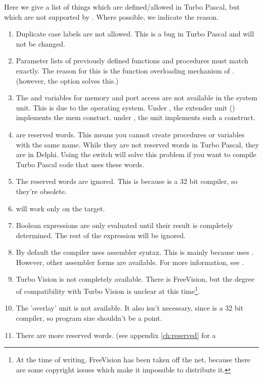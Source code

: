 Here we give a list of things which are defined/allowed in Turbo Pascal, but
which are not supported by \fpc. Where possible, we indicate the reason.
\begin{enumerate}
\item Duplicate case labels are not allowed. This is a bug in Turbo Pascal
and will not be changed.
\item Parameter lists of previously defined functions and procedures must
match exactly. The reason for this is the function overloading mechanism of
\fpc. (however, the  option solves this.)
\item The  and  variables for memory and port
access are not available in the system unit. This is due to the operating system. Under
\dos, the extender unit () implements the mem constuct.
under \linux, the  unit implements such a construct.
\item {}
are reserved words. This means you cannot create procedures or variables
with the same name. While they are not reserved words in Turbo Pascal,
they are in Delphi. Using the  switch will solve this problem if
you want to compile Turbo Pascal code that uses these words.
\item The reserved words  are ignored. This is
because \fpc is a 32 bit compiler, so they're obsolete.
\item {} will work only on the \dos target.
\item Boolean expressions are only evaluated until their result is completely
determined. The rest of the expression will be ignored.
\item By default the compiler uses   assembler syntax.
This is mainly because \fpc uses \gnu {}. However, other assembler
forms are available. For more information, see \progref.
\item Turbo Vision is not completely available. There is FreeVision, but the
degree of compatibility with Turbo Vision is unclear at this
time\footnote{At the time of writing, FreeVision has been taken off the
net, because there are some copyright issues which make it impossible to
distribute it.}.
\item The 'overlay' unit is not available. It also isn't necessary, since
\fpc is a 32 bit compiler, so program size shouldn't be a point.
\item There are more reserved words. (see appendix \ref{ch:reserved} for a

\end{enumerate}
